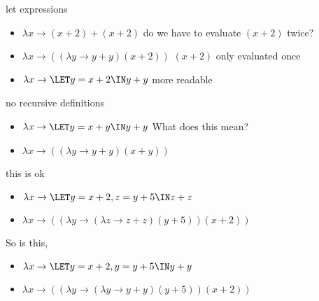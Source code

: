 \begin{frame}{let expressions}
  \begin{itemize}  
   \pause \item $\lambda x \rightarrow  (x + 2) +  (x + 2)$ \pause \hspace{20pt} do we have to evaluate $(x+2)$ twice?
   \pause \item $\lambda x \rightarrow  ((\lambda y \rightarrow y + y) (x + 2))$  \pause  \hspace{20pt} $(x+2)$ only evaluated once
   \pause \item $\lambda x \rightarrow  \LET y = x + 2 \IN y + y $  \pause  \hspace{20pt} more readable 
  \end{itemize}
\end{frame}

\begin{frame}{no recursive definitions}
  \begin{itemize}  
   \pause \item $\lambda x \rightarrow  \LET y = x + y \IN y + y $ \pause \hspace{20pt} What does this mean?
   \pause \item $\lambda x \rightarrow  ((\lambda y \rightarrow y + y) (x + y))$  
  \end{itemize}
\end{frame}

\begin{frame}{this is ok}
  \begin{itemize}  
   \pause \item $\lambda x \rightarrow  \LET y = x + 2 , z = y + 5 \IN z + z $ \pause
   \pause \item $\lambda x \rightarrow  ((\lambda y \rightarrow (\lambda z \rightarrow z + z)(y + 5)) (x + 2))$  
 \end{itemize}

 \pause \vspace{20pt} So is this, 
  \begin{itemize}  
   \pause \item $\lambda x \rightarrow  \LET y = x + 2 , y = y + 5 \IN y + y $ \pause
   \pause \item $\lambda x \rightarrow  ((\lambda y \rightarrow (\lambda y \rightarrow y + y)(y + 5)) (x + 2))$  
  \end{itemize} 
\end{frame}


